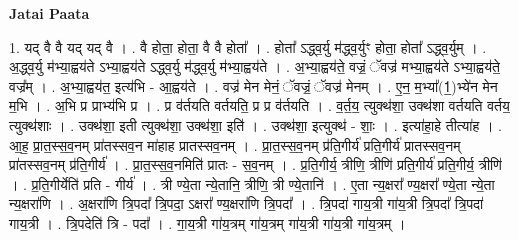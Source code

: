 \documentclass[17pt]{extarticle}
\begin{document}
\textbf{Jatai Paata} \newline

1. यद् वै वै यद् यद् वै । . वै होता॒ होता॒ वै वै होता᳚ । . होता᳚ ऽद्ध्व॒र्यु म॑द्ध्व॒र्युꣳ होता॒ होता᳚ ऽद्ध्व॒र्युम् । . अ॒द्ध्व॒र्यु म॑भ्या॒ह्वय॑ते ऽभ्या॒ह्वय॑ते ऽद्ध्व॒र्यु म॑द्ध्व॒र्यु म॑भ्या॒ह्वय॑ते । . अ॒भ्या॒ह्वय॑ते॒ वज्रं॒ ॅवज्र॑ मभ्या॒ह्वय॑ते ऽभ्या॒ह्वय॑ते॒ वज्र᳚म् । . अ॒भ्या॒ह्वय॑त॒ इत्य॑भि - आ॒ह्वय॑ते । . वज्र॑ मेन मेनं॒ ॅवज्रं॒ ॅवज्र॑ मेनम् । . ए॒न॒ म॒भ्या᳚(1॒)भ्ये॑न मेन म॒भि । . अ॒भि प्र प्राभ्य॑भि प्र । . प्र व॑र्तयति वर्तयति॒ प्र प्र व॑र्तयति । . व॒र्त॒य॒ त्युक्थ॑शा॒ उक्थ॑शा वर्तयति वर्तय॒ त्युक्थ॑शाः । . उक्थ॑शा॒ इती त्युक्थ॑शा॒ उक्थ॑शा॒ इति॑ । . उक्थ॑शा॒ इत्युक्थ॑ - शाः॒ । . इत्या॑हा॒हे तीत्या॑ह । . आ॒ह॒ प्रा॒त॒स्स॒व॒नम् प्रा॑तस्सव॒न मा॑हाह प्रातस्सव॒नम् । . प्रा॒त॒स्स॒व॒नम् प्र॑ति॒गीर्य॑ प्रति॒गीर्य॑ प्रातस्सव॒नम् प्रा॑तस्सव॒नम् प्र॑ति॒गीर्य॑ । . प्रा॒त॒स्स॒व॒नमिति॑ प्रातः - स॒व॒नम् । . प्र॒ति॒गीर्य॒ त्रीणि॒ त्रीणि॑ प्रति॒गीर्य॑ प्रति॒गीर्य॒ त्रीणि॑ । . प्र॒ति॒गीर्येति॑ प्रति - गीर्य॑ । . त्री ण्ये॒ता न्ये॒तानि॒ त्रीणि॒ त्री ण्ये॒तानि॑ । . ए॒ता न्य॒क्षरा᳚ ण्य॒क्षरा᳚ ण्ये॒ता न्ये॒ता न्य॒क्षरा॑णि । . अ॒क्षरा॑णि त्रि॒पदा᳚ त्रि॒पदा॒ ऽक्षरा᳚ ण्य॒क्षरा॑णि त्रि॒पदा᳚ । . त्रि॒पदा॑ गाय॒त्री गा॑य॒त्री त्रि॒पदा᳚ त्रि॒पदा॑ गाय॒त्री । . त्रि॒पदेति॑ त्रि - पदा᳚ । . गा॒य॒त्री गा॑य॒त्रम् गा॑य॒त्रम् गा॑य॒त्री गा॑य॒त्री गा॑य॒त्रम् । \newline
\end{document}
